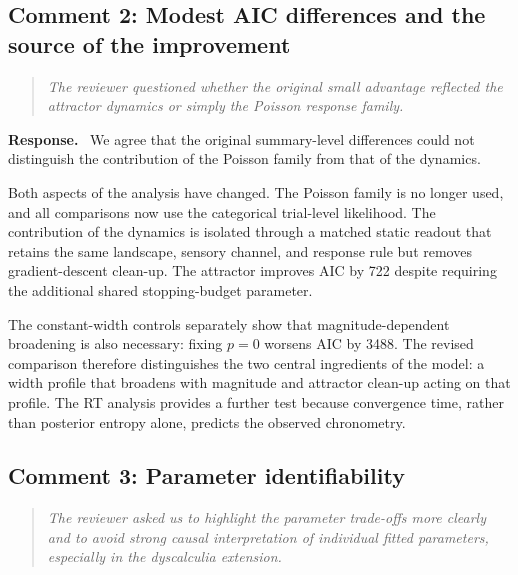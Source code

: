 \documentclass[11pt]{article}
\newenvironment{reviewercomment}{\begin{quote}\color{reviewgray}\itshape}{\end{quote}}
\newenvironment{authorresponse}{\par\noindent\textbf{\color{responseblue}Response.}\ }{\par}
\begin{document}
\subsection*{Comment 2: Modest AIC differences and the source of the improvement}

\begin{reviewercomment}
The reviewer questioned whether the original small advantage reflected the attractor dynamics or simply the Poisson response family.
\end{reviewercomment}

\begin{authorresponse}
We agree that the original summary-level differences could not distinguish the contribution of the Poisson family from that of the dynamics.

Both aspects of the analysis have changed. The Poisson family is no longer used, and all comparisons now use the categorical trial-level likelihood. The contribution of the dynamics is isolated through a matched static readout that retains the same landscape, sensory channel, and response rule but removes gradient-descent clean-up. The attractor improves AIC by 722 despite requiring the additional shared stopping-budget parameter.

The constant-width controls separately show that magnitude-dependent broadening is also necessary: fixing $p=0$ worsens AIC by 3488. The revised comparison therefore distinguishes the two central ingredients of the model: a width profile that broadens with magnitude and attractor clean-up acting on that profile. The RT analysis provides a further test because convergence time, rather than posterior entropy alone, predicts the observed chronometry.
\end{authorresponse}

\subsection*{Comment 3: Parameter identifiability}

\begin{reviewercomment}
The reviewer asked us to highlight the parameter trade-offs more clearly and to avoid strong causal interpretation of individual fitted parameters, especially in the dyscalculia extension.
\end{reviewercomment}
\end{document}
